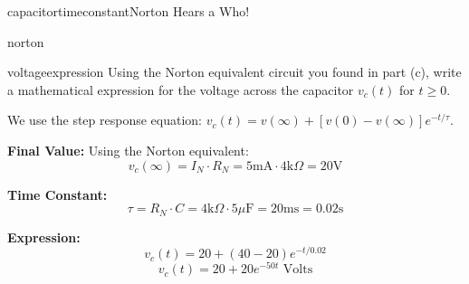 \begin{mainquestion}{capacitortimeconstant}{Norton Hears a Who!}
\begin{partquestion}{norton}
\end{partquestion}

\begin{partquestion}{voltageexpression}
{Using the Norton equivalent circuit you found in part (c), write a mathematical expression for the voltage across the capacitor $v_c(t)$ for $t \ge 0$.}

\begin{answer}[2in]
        We use the step response equation: $v_c(t) = v(\infty) + [v(0) - v(\infty)]e^{-t/\tau}$.
        
        \textbf{Final Value:}
        Using the Norton equivalent:
        \[ v_c(\infty) = I_N \cdot R_N = 5\text{mA} \cdot 4\text{k}\Omega = 20\text{V} \]
        
        \textbf{Time Constant:}
        \[ \tau = R_N \cdot C = 4\text{k}\Omega \cdot 5\mu\text{F} = 20\text{ms} = 0.02\text{s} \]
        
        \textbf{Expression:}
        \[ v_c(t) = 20 + (40 - 20)e^{-t/0.02} \]
        \[ v_c(t) = 20 + 20e^{-50t} \text{ Volts} \]
\end{answer}

\end{partquestion}

\end{mainquestion}
